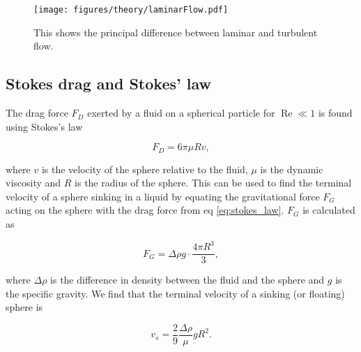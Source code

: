 \begin{figure}[H]
\centering
\texttt{[image: figures/theory/laminarFlow.pdf]}
\caption{This shows the principal difference between laminar and turbulent flow.}
\label{fig:laminar_flow}
\end{figure}

\subsection{Stokes drag and Stokes' law}
The drag force $F_D$ exerted by a fluid on a spherical particle for $\operatorname{Re} \ll 1$ is found using  Stokes's law \cite{introfluid2}

\begin{equation}\label{eq:stokes_law}
F_D = 6\pi \mu R v,
\end{equation}

\noindent where $v$ is the velocity of the sphere relative to the fluid, $\mu$ is the dynamic viscosity and $R$ is the radius of the sphere. This can be used to find the terminal velocity of a sphere sinking in a liquid by equating the gravitational force $F_G$ acting on the sphere with the drag force from eq \ref{eq:stokes_law}. $F_G$ is calculated as

\begin{equation}
F_G = \Delta \rho g\cdot \frac{4\pi R^3}{3},
\end{equation}

\noindent where $\Delta \rho$ is the difference in density between the fluid and the sphere and $g$ is the specific gravity. We find that the terminal velocity of a sinking (or floating) sphere is

\begin{equation}\label{eq:fallingSphere}
v_s = \frac{2}{9} \frac{\Delta \rho}{\mu} g R^2.
\end{equation}
